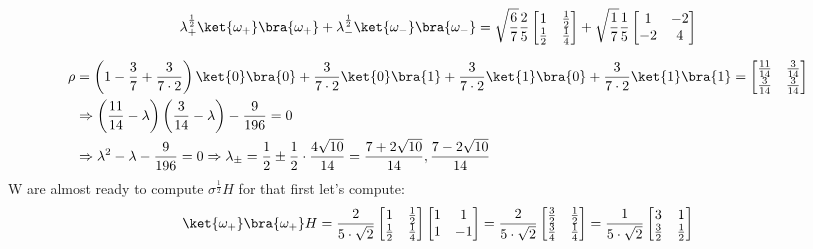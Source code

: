 \documentclass[12pt,a4paper]{article}
\begin{document}
\begin{enumerate}
    \begin{equation*}
      \begin{split}
        \lambda_{+}^{\frac{1}{2}}\ket{\omega_{+}}\bra{\omega_{+}}+ \lambda_{-}^{\frac{1}{2}}\ket{\omega_{-}}\bra{\omega_{-}}= \sqrt{\frac{6}{7}}\frac{2}{5 } \begin{bmatrix} 1 & \frac{1}{2} \\ \frac{1}{2} & \frac{1}{4} \end{bmatrix} + \sqrt{\frac{1}{7}}  \frac{1}{5 } \begin{bmatrix} 1 & -2 \\ -2  & 4 \end{bmatrix} 
      \end{split}
    \end{equation*}

    \begin{equation*}
      \begin{split}
        \rho & = \left( 1 - \frac{3}{7} + \frac{3}{7 \cdot 2 }  \right) \ket{0}\bra{0} + \frac{3}{7 \cdot 2 }\ket{0}\bra{1} +\frac{3}{7 \cdot 2 }\ket{1}\bra{0} +\frac{3}{7 \cdot 2 }\ket{1}\bra{1} = \begin{bmatrix}
             \frac{11}{14}  & \frac{3}{14 }   \\
             \frac{3}{14 } & \frac{3}{14 }   
           \end {bmatrix} \\ 
            & \Rightarrow\left( \frac{11}{14} -  \lambda \right)\left(   \frac{3}{14} - \lambda \right) - \frac{9}{196} = 0 \\ 
            & \Rightarrow  \lambda^2 - \lambda  - \frac{9}{196} = 0 \Rightarrow  \lambda_{\pm} =  \frac{1}{2} \pm \frac{1}{2} \cdot \frac{4\sqrt{10}}{14}  = \frac{7 + 2\sqrt{10}}{14}, \frac{7 - 2\sqrt{10}}{14} \\ 
      \end{split}
    \end{equation*}
    W are almost ready to compute $\sigma^{\frac{1}{2}}H$ for that first let's compute: 
    \begin{equation*}
      \begin{split}
        \ket{\omega_{+}}\bra{\omega_{+}}H &= \frac{2}{5 \cdot \sqrt{2}} \begin{bmatrix} 1 & \frac{1}{2} \\ \frac{1}{2} & \frac{1}{4} \end{bmatrix} \begin{bmatrix} 1 & 1 \\ 1 & - 1 \end{bmatrix} = \frac{2 }{5 \cdot \sqrt{2}}\begin{bmatrix}  \frac{3}{2} & \frac{1}{2} \\  \frac{3}{4} & \frac{1}{4} \end{bmatrix} = \frac{1 }{5 \cdot \sqrt{2}}\begin{bmatrix}  3 & 1 \\  \frac{3}{2} & \frac{1}{2} \end{bmatrix}\\

\end{split}
\end{equation*}
\end{enumerate}
\end{document}
